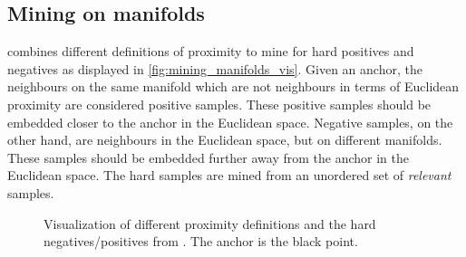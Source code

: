\subsection{Mining on manifolds}\label{subsec:mining_manifolds} %


\citet{mining_manifolds_2018} combines different definitions of proximity to mine 
for hard positives and negatives as displayed in \autoref{fig:mining_manifolds_vis}.
Given an anchor, the neighbours on the same manifold which are not neighbours in terms of 
Euclidean proximity are considered positive samples.
These positive samples should be embedded closer to the anchor in the Euclidean space.
Negative samples, on the other hand, are neighbours in the Euclidean space, 
but on different manifolds.
These samples should be embedded further away from the anchor in the Euclidean space.
The hard samples are mined from an unordered set of \textit{relevant} samples.

\begin{figure}[h]%
    \centering
    \qquad
    \qquad
    \qquad

    \caption{Visualization of different proximity definitions and 
    the hard negatives/positives from \citet{mining_manifolds_2018}.
    The anchor is the black point.}%
    \label{fig:mining_manifolds_vis}%
\end{figure}

